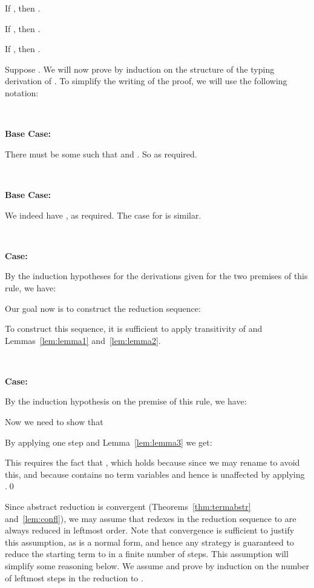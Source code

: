 \documentclass{LMCS}
\begin{document}
\begin{lem}
\label{lem:lemma1}
If  , then
.
\end{lem}
\begin{lem}
\label{lem:lemma2}
If  , then
.
\end{lem}
\begin{lem}
\label{lem:lemma3}
If  , then .
\end{lem}

Suppose .
We will now prove  by
induction on the structure of the typing derivation of .
To simplify the writing of the proof, we will use the
following notation:


\

\noindent \textbf{Base Case:}

\noindent There must be some  such that  and .
So  as required.

\

\noindent\textbf{Base Case:}

\noindent We indeed have , as required.  The case for
 is similar.

\

\noindent \textbf{Case:}

\noindent By the induction hypotheses for the derivations given for
the two premises of this rule, we have:

\noindent Our goal now is to construct the reduction sequence:

\noindent To construct this sequence, it is sufficient to apply transitivity of
 and Lemmas~\ref{lem:lemma1} and~\ref{lem:lemma2}.

\ 

\noindent \textbf{Case:}

\noindent By the induction hypothesis on the premise of this rule,
we have:

\noindent Now we need to show that

\noindent By applying one  step and Lemma~\ref{lem:lemma3}
we get:

\noindent This requires the fact that , which holds because
           since we may rename 
          to avoid this, and because  contains no term variables
          and hence is unaffected by applying .\qed


Since abstract reduction is convergent (Theorems~\ref{thm:termabstr}
and~\ref{lem:confl}), we may assume that redexes in the reduction
sequence to  are always reduced in leftmost order.  Note that
convergence is sufficient to justify this assumption, as  is a
normal form, and hence any strategy is guaranteed to reduce the
starting term to  in a finite number of steps.  This assumption
will simplify some reasoning below.  We assume
 and prove
 by induction on the number  of
leftmost  steps in the reduction to .
\end{document}
